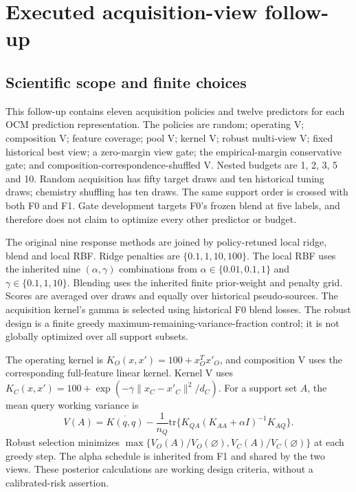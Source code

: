 \section{Executed acquisition-view follow-up}
\subsection{Scientific scope and finite choices}
This follow-up contains eleven acquisition policies and twelve predictors for each OCM prediction representation. The policies are random; operating V; composition V; feature coverage; pool V; kernel V; robust multi-view V; fixed historical best view; a zero-margin view gate; the empirical-margin conservative gate; and composition-correspondence-shuffled V. Nested budgets are 1, 2, 3, 5 and 10. Random acquisition has fifty target draws and ten historical tuning draws; chemistry shuffling has ten draws. The same support order is crossed with both F0 and F1. Gate development targets F0's frozen blend at five labels, and therefore does not claim to optimize every other predictor or budget.

The original nine response methods are joined by policy-retuned local ridge, blend and local RBF. Ridge penalties are $\{0.1,1,10,100\}$. The local RBF uses the inherited nine $(\alpha,\gamma)$ combinations from $\alpha\in\{0.01,0.1,1\}$ and $\gamma\in\{0.1,1,10\}$. Blending uses the inherited finite prior-weight and penalty grid. Scores are averaged over draws and equally over historical pseudo-sources. The acquisition kernel's gamma is selected using historical F0 blend losses. The robust design is a finite greedy maximum-remaining-variance-fraction control; it is not globally optimized over all support subsets.

The operating kernel is $K_O(x,x')=100+x_O^Tx'_O$, and composition V uses the corresponding full-feature linear kernel. Kernel V uses $K_C(x,x')=100+\exp(-\gamma\|x_C-x'_C\|^2/d_C)$. For a support set $A$, the mean query working variance is
\[
 V(A)=\overline{K(q,q)}-\frac{1}{n_Q}\mathrm{tr}\{K_{QA}(K_{AA}+\alpha I)^{-1}K_{AQ}\}.
\]
Robust selection minimizes $\max\{V_O(A)/V_O(\varnothing),V_C(A)/V_C(\varnothing)\}$ at each greedy step. The alpha schedule is inherited from F1 and shared by the two views. These posterior calculations are working design criteria, without a calibrated-risk assertion.

